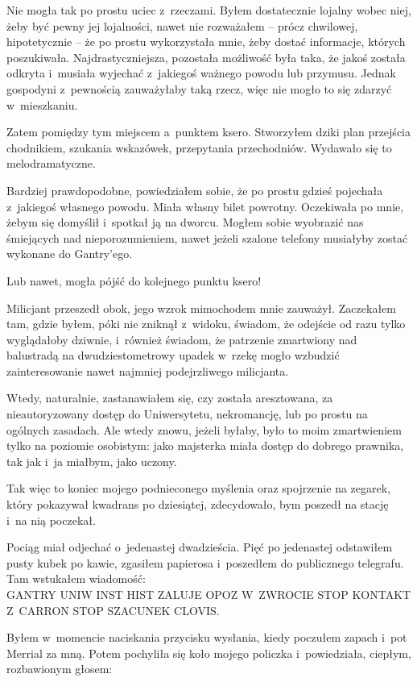 \documentclass[oneside,polish,11pt,sfheadings]{mwbk}
\begin{document}
Nie mogła tak po prostu uciec z~rzeczami. Byłem dostatecznie lojalny
wobec niej, żeby być pewny jej lojalności, nawet nie rozważałem -- prócz
chwilowej, hipotetycznie -- że po prostu wykorzystała mnie, żeby dostać
informacje, których poszukiwała. Najdrastyczniejsza, pozostała możliwość
była taka, że jakoś została odkryta i~musiała wyjechać z~jakiegoś
ważnego powodu lub przymusu. Jednak gospodyni z~pewnością zauważyłaby
taką rzecz, więc nie mogło to się zdarzyć w~mieszkaniu.

Zatem pomiędzy tym miejscem a~punktem ksero. Stworzyłem dziki plan
przejścia chodnikiem, szukania wskazówek, przepytania przechodniów.
Wydawało się to melodramatyczne.

Bardziej prawdopodobne, powiedziałem sobie, że po prostu gdzieś
pojechała z~jakiegoś własnego powodu. Miała własny bilet powrotny.
Oczekiwała po mnie, żebym się domyślił i~spotkał ją na dworcu. Mogłem
sobie wyobrazić nas śmiejących nad nieporozumieniem, nawet jeżeli
szalone telefony musiałyby zostać wykonane do Gantry'ego.

Lub nawet, mogła pójść do kolejnego punktu ksero!

Milicjant przeszedł obok, jego wzrok mimochodem mnie zauważył.
Zaczekałem tam, gdzie byłem, póki nie zniknął z~widoku, świadom, że
odejście od razu tylko wyglądałoby dziwnie, i~również świadom, że
patrzenie zmartwiony nad balustradą na dwudziestometrowy upadek w~rzekę
mogło wzbudzić zainteresowanie nawet najmniej podejrzliwego milicjanta.

Wtedy, naturalnie, zastanawiałem się, czy została aresztowana, za
nieautoryzowany dostęp do Uniwersytetu, nekromancję, lub po prostu na
ogólnych zasadach. Ale wtedy znowu, jeżeli byłaby, było to moim
zmartwieniem tylko na poziomie osobistym: jako majsterka miała dostęp do
dobrego prawnika, tak jak i~ja miałbym, jako uczony.

Tak więc to koniec mojego podnieconego myślenia oraz spojrzenie na
zegarek, który pokazywał kwadrans po dziesiątej, zdecydowało, bym
poszedł na stację i~na nią poczekał.

Pociąg miał odjechać o~jedenastej dwadzieścia. Pięć po jedenastej
odstawiłem pusty kubek po kawie, zgasiłem papierosa i~poszedłem do
publicznego telegrafu. Tam wstukałem wiadomość:\\ GANTRY UNIW INST HIST
ZALUJE OPOZ W~ZWROCIE STOP KONTAKT Z~CARRON STOP SZACUNEK CLOVIS.

Byłem w~momencie naciskania przycisku wysłania, kiedy poczułem zapach i~pot Merrial za mną. Potem pochyliła się koło mojego policzka i~powiedziała, ciepłym, rozbawionym głosem: 
\end{document}
